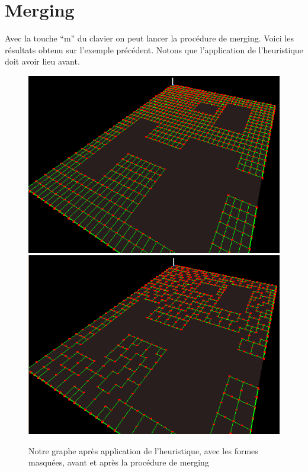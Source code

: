 \documentclass[a4paper,12pt]{report}
\begin{document}
\section{Merging}
 
Avec la touche ``m'' du clavier on peut lancer la procédure de merging. Voici les résultats obtenu sur l'exemple précédent. Notons que l'application de l'heuristique doit avoir lieu avant. 

\begin{figure}[h]
\centering
\includegraphics[scale=0.5]{Images/heuristique3.png}
\includegraphics[scale=0.5]{Images/merging3.png}
\caption{Notre graphe après application de l'heuristique, avec les formes masquées, avant et après la procédure de merging}
\end{figure}
\vspace{0.5cm}
\end{document}

